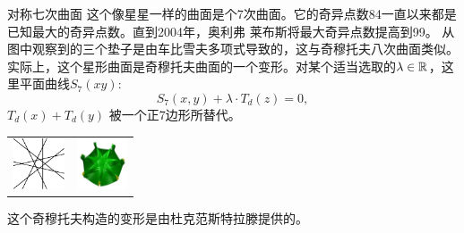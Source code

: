 \begin{surferPage}[7-gon]{对称七次曲面}
这个像星星一样的曲面是个7次曲面。它的奇异点数84一直以来都是已知最大的奇异点数。直到2004年，奥利弗 莱布斯将最大奇异点数提高到99。
从图中观察到的三个垫子是由车比雪夫多项式导致的，这与奇穆托夫八次曲面类似。实际上，这个星形曲面是奇穆托夫曲面的一个变形。对某个适当选取的$\lambda\in{\mathbb R}$，这里平面曲线$S_7(xy)$: \[S_7(x,y) + \lambda \cdot T_d(z) = 0,\] $T_d(x)+T_d(y)$ 被一个正7边形所替代。
\vspace*{-0.3em}
    \begin{center}
      \begin{tabular}{c@{\qquad}c}
        \includegraphics[height=1.5cm]{./../../common/images/labsseptic1.pdf}
        &
        \includegraphics[height=1.5cm]{./../../common/images/septic_7eck_von_oben}
      \end{tabular}
    \end{center}
    \vspace*{-0.3em}
这个奇穆托夫构造的变形是由杜克范斯特拉滕提供的。
\end{surferPage}
